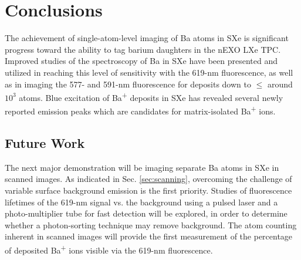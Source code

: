 \chapter{Conclusions}

The achievement of single-atom-level imaging of Ba atoms in SXe is significant progress toward the ability to tag barium daughters in the nEXO LXe TPC.  Improved studies of the spectroscopy of Ba in SXe have been presented and utilized in reaching this level of sensitivity with the 619-nm fluorescence, as well as in imaging the 577- and 591-nm fluorescence for deposits down to $\leq$ around $10^{3}$ atoms.  Blue excitation of Ba\textsuperscript{+} deposits in SXe has revealed several newly reported emission peaks which are candidates for matrix-isolated Ba\textsuperscript{+} ions.



\section{Future Work}
\label{sec:future}

The next major demonstration will be imaging separate Ba atoms in SXe in scanned images.  As indicated in Sec. \ref{sec:scanning}, overcoming the challenge of variable surface background emission is the first priority.  Studies of fluorescence lifetimes of the 619-nm signal vs. the background using a pulsed laser and a photo-multiplier tube for fast detection will be explored, in order to determine whether a photon-sorting technique may remove background.  The atom counting inherent in scanned images will provide the first measurement of the percentage of deposited Ba\textsuperscript{+} ions visible via the 619-nm fluorescence.

